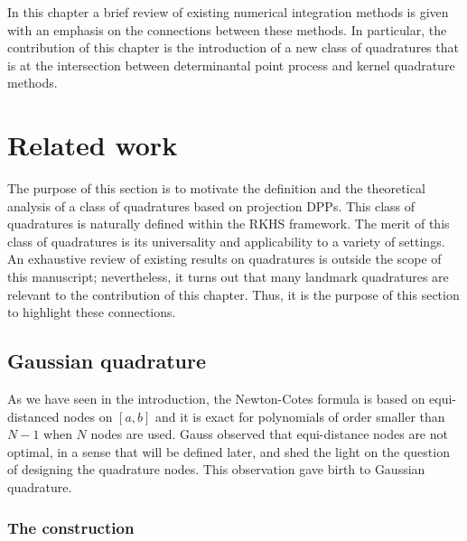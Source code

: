 \documentclass[twoside,11pt]{book}
\numberwithin{theorem}{chapter}
\numberwithin{definition}{chapter}
\numberwithin{proposition}{chapter}
\numberwithin{corollary}{chapter}
\numberwithin{example}{chapter}
\numberwithin{lemma}{chapter}
\numberwithin{assumption}{chapter}
\begin{document}
In this chapter a brief review of existing numerical integration methods is given with an emphasis on the connections between these methods. In particular, the contribution of this chapter is the introduction of a new class of quadratures that is at the intersection between determinantal point process and kernel quadrature methods.



\section{Related work}
The purpose of this section is to motivate the definition and the theoretical analysis of a class of quadratures based on projection DPPs. This class of quadratures is naturally defined within the RKHS framework. The merit of this class of quadratures is its universality and applicability to a variety of settings. An exhaustive review of existing results on quadratures is outside the scope of this manuscript; nevertheless, it turns out that many landmark quadratures are relevant to the contribution of this chapter. 
Thus, it is the purpose of this section to highlight these connections.







\subsection{Gaussian quadrature}\label{sec:Gaussian_quadrature}
As we have seen in the introduction, the Newton-Cotes formula is based on equi-distanced nodes on $[a,b]$ and it is exact for polynomials of order smaller than $N-1$ when $N$ nodes are used. Gauss \citep{Gau1815} observed that equi-distance nodes are not optimal, in a sense that will be defined later, and shed the light on the question of designing the quadrature nodes. This observation gave birth to Gaussian quadrature.

\subsubsection{The construction}
\end{document}
